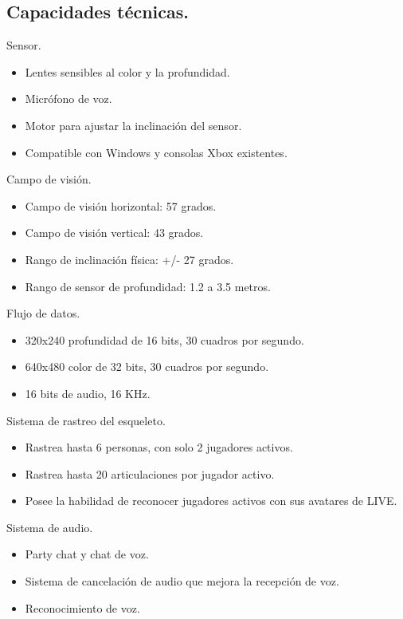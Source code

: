 \documentclass[11pt,a4paper]{article}
\begin{document}
\subsection{Capacidades técnicas.}
Sensor.
\begin{itemize} %
\item Lentes sensibles al color y la profundidad.
\item Micrófono de voz.
\item Motor para ajustar la inclinación del sensor.
\item Compatible con Windows y consolas Xbox existentes.
\end{itemize}
Campo de visión.
\begin{itemize} 
\item Campo de visión horizontal: 57 grados.
\item Campo de visión vertical: 43 grados.
\item Rango de inclinación física: +/- 27 grados.
\item Rango de sensor de profundidad:  1.2 a 3.5 metros.
\end{itemize}
Flujo de datos. 
\begin{itemize} 
\item 320x240  profundidad de 16 bits, 30 cuadros por segundo.
\item 640x480 color de 32 bits, 30 cuadros por segundo.
\item 16 bits de audio, 16 KHz.
\end{itemize}
Sistema de rastreo del esqueleto.
\begin{itemize} 
\item Rastrea hasta 6 personas, con solo 2 jugadores activos.
\item Rastrea hasta 20 articulaciones por jugador activo.
\item Posee la habilidad de reconocer jugadores activos con sus avatares de LIVE.
\end{itemize}
Sistema de audio.
\begin{itemize} 
\item Party chat y chat de voz.
\item Sistema de cancelación de audio que mejora la recepción de voz.
\item Reconocimiento de voz.
\end{itemize}
\end{document}
